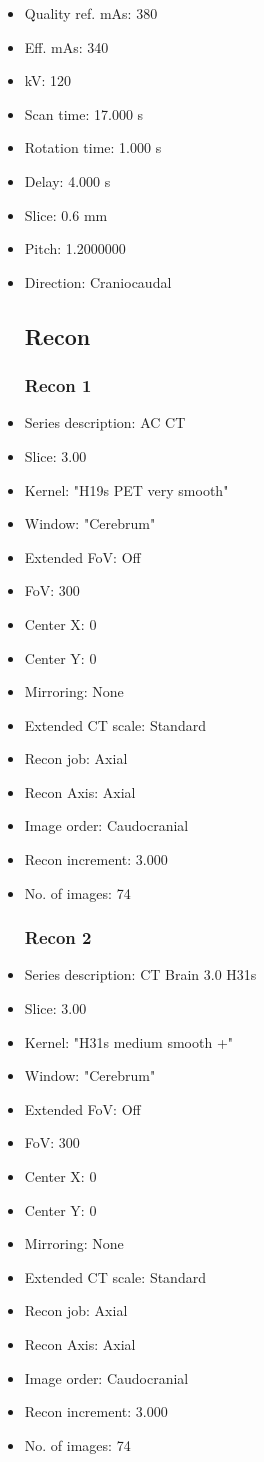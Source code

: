 \documentclass[12pt]{article}
\begin{document}
\begin{itemize}
\subsection{Scan}
\item Quality ref. mAs: 380\item Eff. mAs: 340\item kV: 120\item Scan time: 17.000 s\item Rotation time: 1.000 s\item Delay: 4.000 s\item Slice: 0.6 mm\item Pitch: 1.2000000\item Direction: Craniocaudal
\subsection{Recon}

\subsubsection{Recon 1}
\item Series description: AC CT
\item Slice: 3.00
\item Kernel: "H19s PET very smooth"
\item Window: "Cerebrum"
\item Extended FoV: Off
\item FoV: 300
\item Center X: 0
\item Center Y: 0
\item Mirroring: None
\item Extended CT scale: Standard
\item Recon job: Axial
\item Recon Axis: Axial
\item Image order: Caudocranial
\item Recon increment: 3.000
\item No. of images: 74
\subsubsection{Recon 2}
\item Series description: CT Brain 3.0 H31s
\item Slice: 3.00
\item Kernel: "H31s medium smooth +"
\item Window: "Cerebrum"
\item Extended FoV: Off
\item FoV: 300
\item Center X: 0
\item Center Y: 0
\item Mirroring: None
\item Extended CT scale: Standard
\item Recon job: Axial
\item Recon Axis: Axial
\item Image order: Caudocranial
\item Recon increment: 3.000
\item No. of images: 74

\end{itemize}
\end{document}
